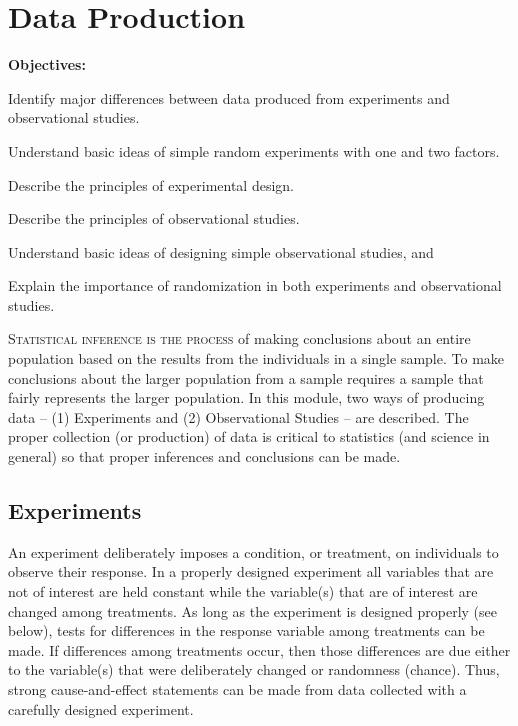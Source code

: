 \documentclass[10pt,openany]{book}\usepackage[]{graphicx}\usepackage[]{color}
\begin{document}
\chapter{Data Production} \label{chap:DataProd}
\begin{ChapObj}{\boxwidth}
  \textbf{Objectives:}
  \begin{Enumerate}
    \item Identify major differences between data produced from experiments and observational studies.
    \item Understand basic ideas of simple random experiments with one and two factors.
    \item Describe the principles of experimental design.
    \item Describe the principles of observational studies.
    \item Understand basic ideas of designing simple observational studies, and
    \item Explain the importance of randomization in both experiments and observational studies.
  \end{Enumerate}
\end{ChapObj}

\minitoc
\newpage

\lettrine{S}{tatistical inference is the process} of making conclusions about an entire population based on the results from the individuals in a single sample.  To make conclusions about the larger population from a sample requires a sample that fairly represents the larger population.  In this module, two ways of producing data -- (1) Experiments and (2) Observational Studies -- are described.  The proper collection (or production) of data is critical to statistics (and science in general) so that proper inferences and conclusions can be made.




\section{Experiments}
An experiment deliberately imposes a condition, or treatment, on individuals to observe their response.  In a properly designed experiment all variables that are not of interest are held constant while the variable(s) that are of interest are changed among treatments.  As long as the experiment is designed properly (see below), tests for differences in the response variable among treatments can be made.  If differences among treatments occur, then those differences are due either to the variable(s) that were deliberately changed or randomness (chance).  Thus, strong cause-and-effect statements can be made from data collected with a carefully designed experiment.
\end{document}
